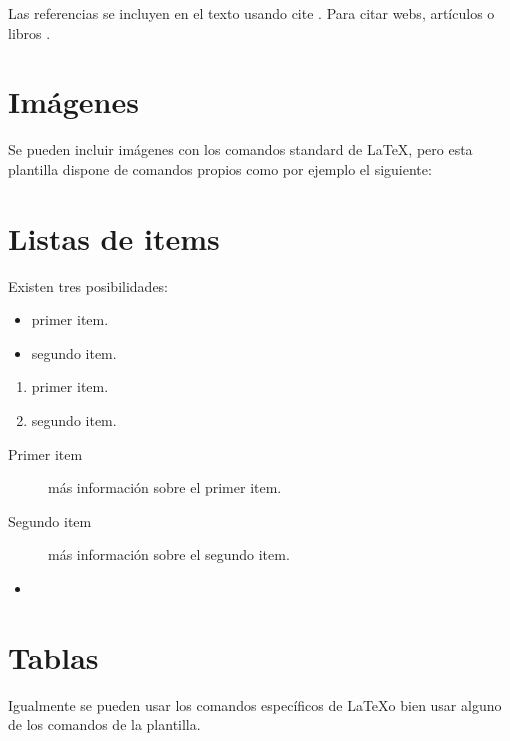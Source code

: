Las referencias se incluyen en el texto usando cite \cite{wiki:latex}. Para citar webs, artículos o libros \cite{wiki:latex}.


\section{Imágenes}

Se pueden incluir imágenes con los comandos standard de \LaTeX, pero esta plantilla dispone de comandos propios como por ejemplo el siguiente:




\section{Listas de items}

Existen tres posibilidades:

\begin{itemize}
	\item primer item.
	\item segundo item.
\end{itemize}

\begin{enumerate}
	\item primer item.
	\item segundo item.
\end{enumerate}

\begin{description}
	\item[Primer item] más información sobre el primer item.
	\item[Segundo item] más información sobre el segundo item.
\end{description}
	
\begin{itemize}
\item 
\end{itemize}

\section{Tablas}

Igualmente se pueden usar los comandos específicos de \LaTeX o bien usar alguno de los comandos de la plantilla.

